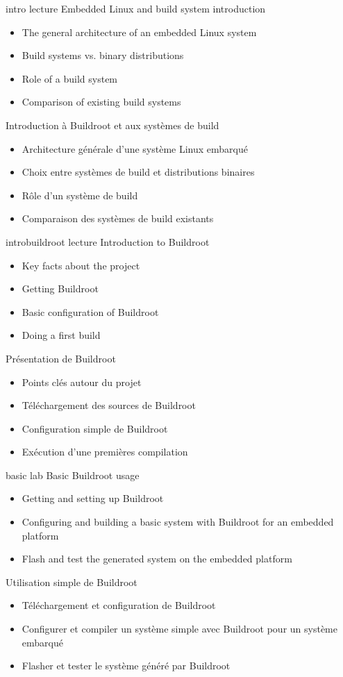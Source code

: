 {intro}
{lecture}
{Embedded Linux and build system introduction}
{
  \begin{itemize}
  \item The general architecture of an embedded Linux system
  \item Build systems vs. binary distributions
  \item Role of a build system
  \item Comparison of existing build systems
  \end{itemize}
}
{Introduction à Buildroot et aux systèmes de build}
{
  \begin{itemize}
  \item Architecture générale d'une système Linux embarqué
  \item Choix entre systèmes de build et distributions binaires
  \item Rôle d'un système de build
  \item Comparaison des systèmes de build existants
  \end{itemize}
}
{introbuildroot}
{lecture}
{Introduction to Buildroot}
{
  \begin{itemize}
  \item Key facts about the project
  \item Getting Buildroot
  \item Basic configuration of Buildroot
  \item Doing a first build
  \end{itemize}
}
{Présentation de Buildroot}
{
  \begin{itemize}
  \item Points clés autour du projet
  \item Téléchargement des sources de Buildroot
  \item Configuration simple de Buildroot
  \item Exécution d'une premières compilation
  \end{itemize}
}
{basic}
{lab}
{Basic Buildroot usage}
{
  \begin{itemize}
  \item Getting and setting up Buildroot
  \item Configuring and building a basic system with Buildroot for an
    embedded platform
  \item Flash and test the generated system on the embedded platform
  \end{itemize}
}
{Utilisation simple de Buildroot}
{
  \begin{itemize}
  \item Téléchargement et configuration de Buildroot
  \item Configurer et compiler un système simple avec Buildroot pour
    un système embarqué
  \item Flasher et tester le système généré par Buildroot
  \end{itemize}
}
